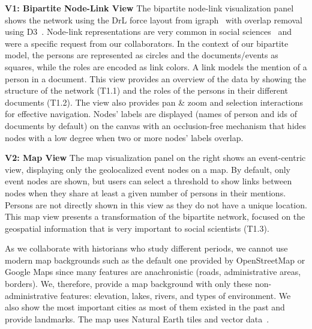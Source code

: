 \noindent\textbf{V1: Bipartite Node-Link View}
The bipartite node-link visualization panel shows the network using the DrL force layout from igraph~\cite{igraph} with overlap removal using D3~\cite{d3}.
Node-link representations are very common in social sciences~\cite{Gephi, pajek, NodeXL, cristofoliPrincipesUsagesDessins} and were a specific request from our collaborators.
In the context of our bipartite model, the persons are represented as circles and the documents/events as squares, while the roles are encoded as link colors.
A link models the mention of a person in a document.
This view provides an overview of the data by showing the structure of the network (T1.1) and the roles of the persons in their different documents (T1.2).
The view also provides pan \& zoom and selection interactions for effective navigation.
Nodes' labels are displayed (names of person and ids of documents by default) on the canvas with an occlusion-free mechanism that hides nodes with a low degree when two or more nodes' labels overlap.


\noindent\textbf{V2: Map View}
The map visualization panel on the right shows an event-centric view, displaying only the geolocalized event nodes on a map.
By default, only event nodes are shown, but users can select a threshold to show links between nodes when they share at least a given number of persons in their mentions.
Persons are not directly shown in this view as they do not have a unique location.
This map view presents a transformation of the bipartite network, focused on the geospatial information that is very important to social scientists (T1.3).

As we collaborate with historians who study different periods, we cannot use modern map backgrounds such as the default one provided by OpenStreetMap or Google Maps since many features are anachronistic (\eg roads, administrative areas, borders). We, therefore, provide a map background with only these non-administrative features: elevation, lakes, rivers, and types of environment.
We also show the most important cities as most of them existed in the past and provide landmarks.
The map uses Natural Earth tiles and vector data~\cite{NaturalEarth}.

